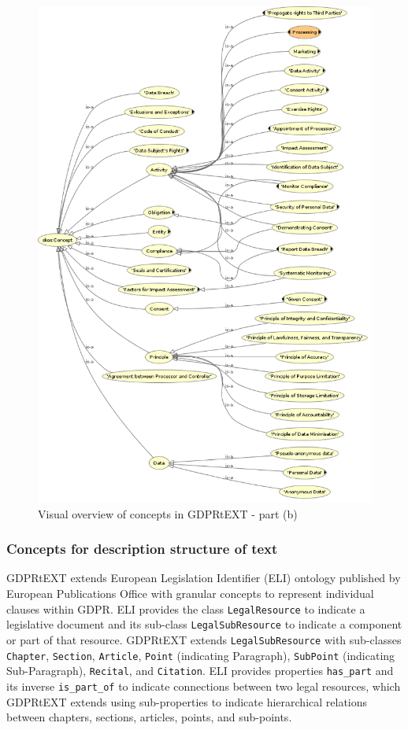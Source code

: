 \begin{figure}[htbp]
    \centering
    \includegraphics[width=0.75\linewidth]{img/gdprtext-summary-b}
    \caption{Visual overview of concepts in GDPRtEXT - part (b) \cite{pandit_gdprtext_2018}}
    \label{fig:vocab:gdprtext-summary-b}
\end{figure}

\subsubsection{Concepts for description structure of text}
GDPRtEXT extends European Legislation Identifier (ELI) \cite{thomas_european_2019} ontology published by European Publications Office with granular concepts to represent individual clauses within GDPR. 
ELI provides the class \texttt{LegalResource} to indicate a legislative document and its sub-class \texttt{LegalSubResource} to indicate a component or part of that resource. GDPRtEXT extends \texttt{LegalSubResource} with sub-classes \texttt{Chapter}, \texttt{Section}, \texttt{Article}, \texttt{Point} (indicating Paragraph), \texttt{SubPoint} (indicating Sub-Paragraph), \texttt{Recital}, and \texttt{Citation}.
ELI provides properties \texttt{has\_part} and its inverse \texttt{is\_part\_of} to indicate connections between two legal resources, which GDPRtEXT extends using sub-properties to indicate hierarchical relations between chapters, sections, articles, points, and sub-points.

